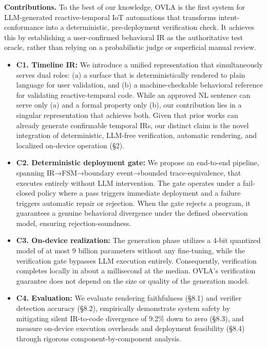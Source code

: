 \documentclass[sigconf,nonacm,anonymous,review]{acmart}
\begin{document}
\medskip\noindent\textbf{Contributions.} 
To the best of our knowledge, OVLA is the first system for LLM-generated reactive-temporal IoT automations that transforms intent-conformance into a deterministic, pre-deployment verification check. It achieves this by establishing a user-confirmed behavioral IR as the authoritative test oracle, rather than relying on a probabilistic judge or superficial manual review.
\begin{itemize}
\item \textbf{C1. Timeline IR:} We introduce a unified representation that simultaneously serves dual roles:
(a) a surface that is deterministically rendered to plain language for user validation, and (b) a machine-checkable behavioral reference for validating reactive-temporal code. While an approved NL sentence can serve only (a) and a formal property only (b), our contribution lies in a singular representation that achieves both. Given that prior works can already generate confirmable temporal IRs, our distinct claim is the novel integration of deterministic, LLM-free verification, automatic rendering, and localized on-device operation
(\S2).
\item \textbf{C2. Deterministic deployment gate:} We propose an end-to-end pipeline, spanning IR→FSM→boundary event→bounded trace-equivalence, that executes entirely without LLM intervention. The gate operates under a fail-closed policy where a pass triggers immediate deployment and a failure triggers automatic repair or rejection.
When the gate rejects a program, it guarantees a genuine behavioral divergence under the defined observation model, ensuring rejection-soundness.
\item \textbf{C3. On-device realization:} The generation phase utilizes a 4-bit quantized model of at most 9 billion parameters without any fine-tuning, while the verification gate bypasses LLM execution entirely. Consequently, verification completes locally in about a millisecond at the median. OVLA's verification guarantee does not depend on the size or quality of the generation model.
\item \textbf{C4. Evaluation:} We evaluate rendering faithfulness (\S8.1) and verifier detection accuracy (\S8.2), empirically demonstrate system safety by mitigating silent IR-to-code divergence of 9.2\% down to zero (\S8.3), and measure on-device execution overheads and deployment feasibility (\S8.4) through rigorous component-by-component analysis.
\end{itemize}
\end{document}
